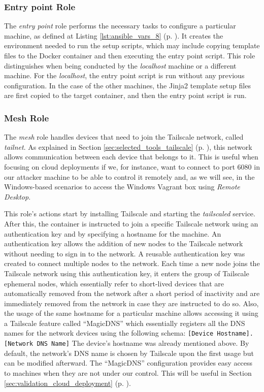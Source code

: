 \subsubsection{Entry point Role} \label{sec:ansible_entrypoint_role}

The \textit{entry point} role performs the necessary tasks to configure a particular machine, as defined at Listing \ref{lst:ansible_vars_8} (p. \pageref{lst:ansible_vars_8}). It creates the environment needed to run the setup scripts, which may include copying template files to the Docker container and then executing the entry point script. This role distinguishes when being conducted by the \textit{localhost} machine or a different machine. For the \textit{localhost}, the entry point script is run without any previous configuration. In the case of the other machines, the Jinja2 template setup files are first copied to the target container, and then the entry point script is run.

\subsubsection{Mesh Role} \label{sec:ansible_mesh_role}

The \textit{mesh} role handles devices that need to join the Tailscale network, called \textit{tailnet}. As explained in Section \ref{sec:selected_tools_tailscale} (p. \pageref{sec:selected_tools_tailscale}), this network allows communication between each device that belongs to it. This is useful when focusing on cloud deployments if we, for instance, want to connect to port 6080 in our attacker machine to be able to control it remotely and, as we will see, in the Windows-based scenarios to access the Windows Vagrant box using \textit{Remote Desktop}.

This role's actions start by installing Tailscale and starting the \textit{tailscaled} service. After this, the container is instructed to join a specific Tailscale network using an authentication key and by specifying a hostname for the machine. An authentication key allows the addition of new nodes to the Tailscale network without needing to sign in to the network. A reusable authentication key was created to connect multiple nodes to the network. Each time a new node joins the Tailscale network using this authentication key, it enters the group of Tailscale ephemeral nodes, which essentially refer to short-lived devices that are automatically removed from the network after a short period of inactivity and are immediately removed from the network in case they are instructed to do so. Also, the usage of the same hostname for a particular machine allows accessing it using a Tailscale feature called ``MagicDNS'' which essentially registers all the DNS names for the network devices using the following schema: \texttt{[Device Hostname].[Network DNS Name]}
The device's hostname was already mentioned above. By default, the network's DNS name is chosen by Tailscale upon the first usage but can be modified afterward. The ``MagicDNS'' configuration provides easy access to machines when they are not under our control. This will be useful in Section \ref{sec:validation_cloud_deployment} (p. \pageref{sec:validation_cloud_deployment}).

